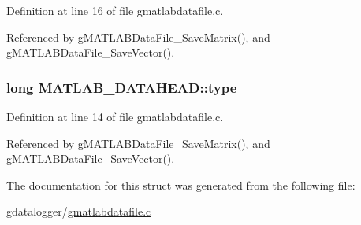 Definition at line 16 of file gmatlabdatafile.\-c.



Referenced by g\-M\-A\-T\-L\-A\-B\-Data\-File\-\_\-\-Save\-Matrix(), and g\-M\-A\-T\-L\-A\-B\-Data\-File\-\_\-\-Save\-Vector().

\hypertarget{structMATLAB__DATAHEAD_ad3587e58da5ca6cbe3cd98d5e2f46202}{
\subsubsection[{type}]{\setlength{\rightskip}{0pt plus 5cm}long M\-A\-T\-L\-A\-B\-\_\-\-D\-A\-T\-A\-H\-E\-A\-D\-::type}}\label{structMATLAB__DATAHEAD_ad3587e58da5ca6cbe3cd98d5e2f46202}


Definition at line 14 of file gmatlabdatafile.\-c.



Referenced by g\-M\-A\-T\-L\-A\-B\-Data\-File\-\_\-\-Save\-Matrix(), and g\-M\-A\-T\-L\-A\-B\-Data\-File\-\_\-\-Save\-Vector().



The documentation for this struct was generated from the following file\-:\begin{DoxyCompactItemize}
\item 
gdatalogger/\hyperlink{gmatlabdatafile_8c}{gmatlabdatafile.\-c}\end{DoxyCompactItemize}
